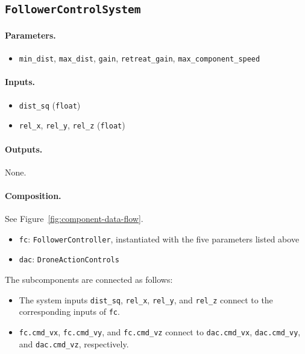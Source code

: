 \documentclass{article}
\begin{document}
\subsection{\texttt{FollowerControlSystem}}

\paragraph{Parameters.}
\begin{itemize}
    \item \verb|min_dist|, \verb|max_dist|, \verb|gain|,
          \verb|retreat_gain|, \verb|max_component_speed|
\end{itemize}

\paragraph{Inputs.}
\begin{itemize}
    \item \verb|dist_sq| (\verb|float|)
    \item \verb|rel_x|, \verb|rel_y|, \verb|rel_z| (\verb|float|)
\end{itemize}

\paragraph{Outputs.} None.

\paragraph{Composition.}
See Figure~\ref{fig:component-data-flow}.
\begin{itemize}
    \item \verb|fc|: \verb|FollowerController|, instantiated with the five
          parameters listed above
    \item \verb|dac|: \verb|DroneActionControls|
\end{itemize}
The subcomponents are connected as follows:
\begin{itemize}
    \item The system inputs \verb|dist_sq|, \verb|rel_x|, \verb|rel_y|, and
          \verb|rel_z| connect to the corresponding inputs of \verb|fc|.
    \item \verb|fc.cmd_vx|, \verb|fc.cmd_vy|, and \verb|fc.cmd_vz| connect to
          \verb|dac.cmd_vx|, \verb|dac.cmd_vy|, and \verb|dac.cmd_vz|,
          respectively.
\end{itemize}
\end{document}
